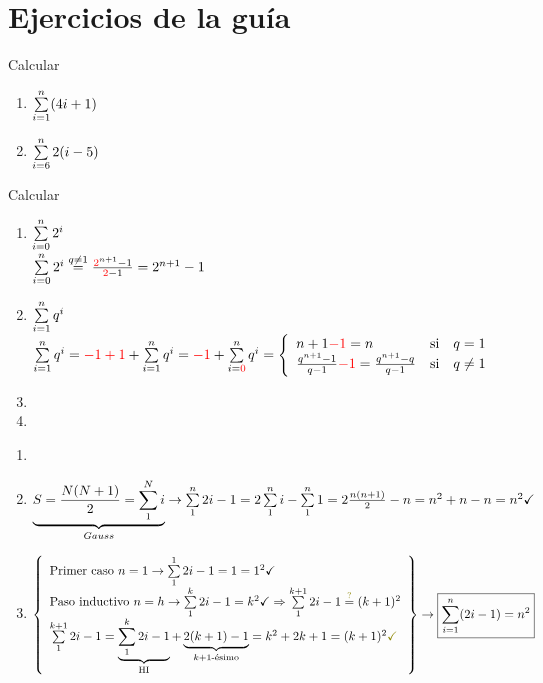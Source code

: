 \documentclass[12pt,a4paper, spanish]{article}
\begin{document}
\section*{Ejercicios de la guía}
\ejercicio
\hacer


\ejercicio

\hacer


\ejercicio
Calcular
\begin{multicols}{2}
	\begin{enumerate}[label=\roman*)]
		\item $ \sumatoria{i=1}{n} (4i + 1) $
		      \hacer


		\item $\sumatoria{i=6}{n} 2(i-5)$
		      \hacer

	\end{enumerate}
\end{multicols}

\ejercicio Calcular \begin{enumerate}[label=\roman*)] \item $\sumatoria{i=0}{n}2^i$\\
	      $ \sumatoria{i=0}{n}2^i \stackrel{q\neq1} = \frac{\red{2}^{n+1} - 1}{\red{$2$} - 1} = 2^{n+1} - 1 $

	\item $\sumatoria{i=1}{n} q^i$\\
	      $\sumatoria{i=1}{n} q^i = \red{$-1 + 1$} + \sumatoria{i=1}{n} q^i = \red{$-1$} + \sumatoria{i = \red{$0$}}{n} q^i =
		      \llave{lll}{
			      n + 1 \red{$-1$} = n & \text{si} & q = 1\\
			      \frac{q^{n+1}-1}{q-1} \red{$-1$} = \frac{q^{n+1} - q}{q-1} & \text{si} & q \distinto 1\\
		      }$

	\item \hacer
	\item \hacer
\end{enumerate}

\ejercicio
\begin{enumerate}[label=\roman*)]
	\item
	      \hacer

	\item $\underbrace{S = \frac{N(N+1)}{2} = \sumatoria{1}{N} i }_{Gauss} \to \sumatoria{1}{n} 2i -1 = 2 \sumatoria{1}{n}i - \sumatoria{1}{n} 1 = 2 \frac{n (n+1)}{2} - n = n^2 + n -n = n^2 \checkmark $

	\item $
		      \llaves{ l }{
			      \text{Primer caso } n = 1 \to \sumatoria{1}{1} 2i -1 = 1 = 1^2 \checkmark\\
			      \text{Paso inductivo } n = h \to \sumatoria{1}{k} 2i -1 = k^2 \checkmark \entonces \sumatoria{1}{k+1} 2i -1 \stackrel{\green{?}}= (k+1)^2\\
			      \sumatoria{1}{k+1} 2i -1 =
			      \HI{
				      \sumatoria{1}{k} 2i -1
			      } + \kmasuno{
				      2(k+1) -1
			      } = k^2 + 2k + 1 = (k+1)^2 \green{\checkmark}
		      } \to \boxed{\sumatoria{i = 1}{n} (2i - 1) = n^2}$
\end{enumerate}
\end{document}
